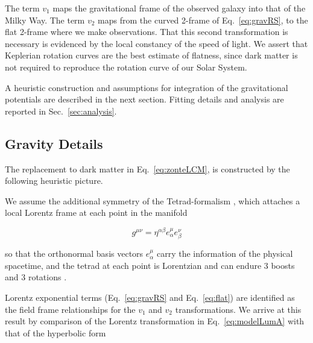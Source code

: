 \documentclass[reprint,%
 amsmath,amssymb,
 aps,
]{revtex4-1}
\begin{document}
The   term $v_1$ maps the gravitational frame of the observed galaxy into that of the Milky Way. The   term $v_2$    maps from  the   curved 2-frame  of  Eq.~\ref{eq:gravRS},  to  the flat 2-frame where we make observations. 
  That this second transformation  is necessary is evidenced by the local constancy of the speed of light. 
  We assert that Keplerian rotation curves are     the best estimate of flatness, since dark matter is not required to  reproduce the rotation curve of our Solar System.
 
    
  
 
  A heuristic construction  and assumptions for integration of the gravitational potentials are described in the next section. Fitting details and analysis are reported in Sec.~\ref{sec:analysis}. 
   
 

 
 
\subsection{Gravity Details \label{sec:gravDets}}

The replacement to dark matter in Eq.~\ref{eq:zonteLCM}, is constructed by  the following heuristic picture. 

We   assume 
   the  additional symmetry of the  Tetrad-formalism \cite{BertschingerClassTetrads}, which attaches  a    local Lorentz frame   at each point in the manifold 


\begin{equation}
    g^{\mu \nu} = \eta^{\alpha \beta} e^\mu_\alpha  e^\nu_\beta
\end{equation} 

so that the orthonormal  basis vectors  $e^\mu_\alpha$ carry the information of the physical spacetime, and the tetrad at each point is Lorentzian and   can endure 3 boosts and 3 rotations \cite{BertschingerClassTetrads}.  
 
   
  Lorentz exponential terms (Eq.~\ref{eq:gravRS} and Eq.~\ref{eq:flat})
  are    identified  as the field frame relationships for the $v_1$ and $v_2$ transformations. We arrive at this result  by  comparison of 
     the  Lorentz transformation in  Eq.~\ref{eq:modelLumA} with 
 that of the    hyperbolic form \cite{rindler2013essential} 
\end{document}
